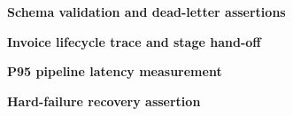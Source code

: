 \documentclass[a4paper,10pt]{article}
\newcommand{\snippettitle}[1]{\noindent\textbf{\large #1}\par\vspace{6pt}}
\begin{document}
\snippettitle{Schema validation and dead-letter assertions}


\clearpage
\snippettitle{Invoice lifecycle trace and stage hand-off}



\clearpage
\snippettitle{P95 pipeline latency measurement}



\clearpage
\snippettitle{Hard-failure recovery assertion}

\end{document}
